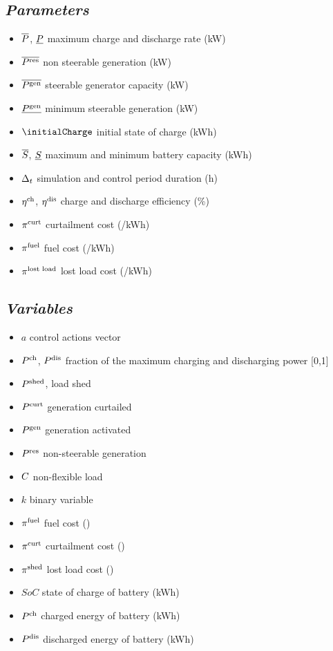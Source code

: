 \documentclass{article}
\begin{document}
\vspace*{0.25cm}
\subsection*{\textit{\textbf{Parameters}}}
\begin{itemize}
	\item $\overline{P}$, $\underline{P}$ maximum charge and discharge rate (kW)
	\item $\overline{P^\text{res}}$ non steerable generation (kW)
	\item $\overline{P^\text{gen}}$ steerable generator capacity (kW)
	\item $\underline{P^\text{gen}}$ minimum steerable generation (kW)
	\item $\initialCharge$ initial state of charge (kWh)
	\item $\overline{S}$, $\underline{S}$ maximum and minimum battery capacity (kWh)
	\item $\Delta_t$ simulation and control period duration (h)
	\item $\eta^{\text{ch}}$, $\eta^{\text{dis}}$ charge and discharge efficiency (\%) 
	\item $\pi^{\text{curt}}$ curtailment cost (\texteuro/kWh)
	\item $\pi^{\text{fuel}}$ fuel cost (\texteuro/kWh)
	\item $\pi^{\text{lost load}}$ lost load cost (\texteuro/kWh)

	
\end{itemize}
\subsection*{\textit{\textbf{Variables}}}
\begin{itemize}
	\item $a$ control actions vector
	\item $P^{\text{ch}}$, $P^{\text{dis}}$ fraction of the maximum charging and discharging power [0,1]
	\item $P^\text{shed}$, load shed
	\item $P^\text{curt}$ generation curtailed
	\item $P^\text{gen}$ generation activated
	\item $P^\text{res}$ non-steerable generation
	\item $C$ non-flexible load
	\item $k$ binary variable 
	\item $\pi^{\text{fuel}}$ fuel cost (\texteuro)
	\item $\pi^{\text{curt}}$ curtailment cost (\texteuro)
	\item $\pi^{\text{shed}}$ lost load cost (\texteuro)
	\item $SoC$ state of charge of battery (kWh)
	\item $P^{\text{ch}}$ charged energy of battery (kWh)
	\item $P^{\text{dis}}$ discharged energy of battery (kWh)

\end{itemize}
\end{document}
